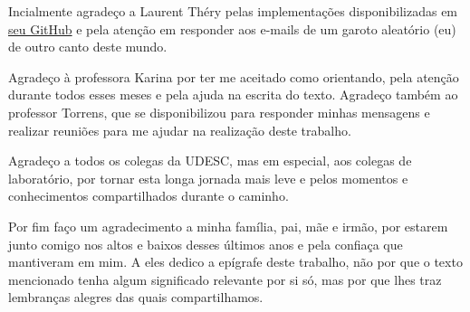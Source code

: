 \begin{agradecimentos}
	Incialmente agradeço a Laurent Théry pelas implementações disponibilizadas em \hyperlink{https://github.com/thery/mathcomp-extra/blob/master/euler.v}{seu GitHub} e pela atenção em responder aos e-mails de um garoto aleatório (eu) de outro canto deste mundo.

	Agradeço à professora Karina por ter me aceitado como orientando, pela atenção durante todos esses meses e pela ajuda na escrita do texto. Agradeço também ao professor Torrens, que se disponibilizou para responder minhas mensagens e realizar reuniões para me ajudar na realização deste trabalho.

	Agradeço a todos os colegas da UDESC, mas em especial, aos colegas de laboratório, por tornar esta longa jornada mais leve e pelos momentos e conhecimentos compartilhados durante o caminho.

	Por fim faço um agradecimento a minha família, pai, mãe e irmão, por estarem junto comigo nos altos e baixos desses últimos anos e pela confiaça que mantiveram em mim. A eles dedico a epígrafe deste trabalho, não por que o texto mencionado tenha algum significado relevante por si só, mas por que lhes traz lembranças alegres das quais compartilhamos.
\end{agradecimentos}


